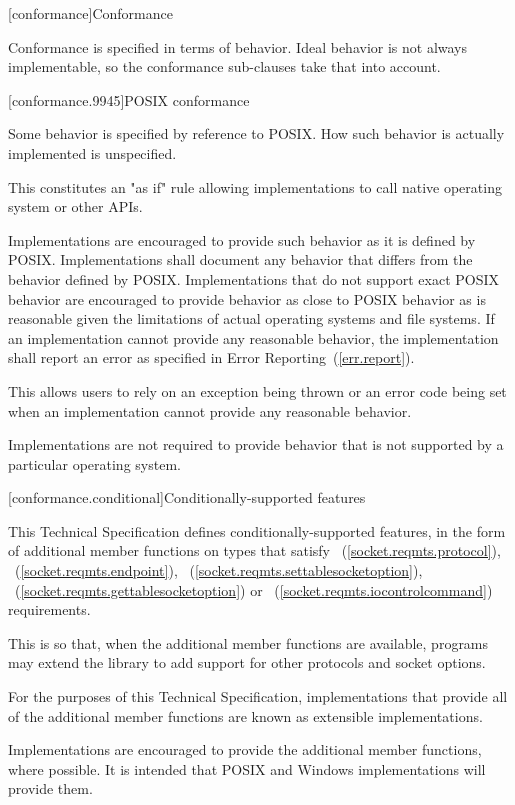 
[conformance]{Conformance}

\pnum
 Conformance is specified in terms of behavior. Ideal behavior is not always implementable, so the conformance sub-clauses take that into account.


[conformance.9945]{POSIX conformance}

\pnum
 Some behavior is specified by reference to POSIX. How such behavior is actually implemented is unspecified.

\pnum
 \enternote This constitutes an "as if" rule allowing implementations to call native operating system or other APIs. \exitnote

\pnum
Implementations are encouraged to provide such behavior as it is defined by POSIX. Implementations shall document any behavior that differs from the behavior defined by POSIX. Implementations that do not support exact POSIX behavior are encouraged to provide behavior as close to POSIX behavior as is reasonable given the limitations of actual operating systems and file systems. If an implementation cannot provide any reasonable behavior, the implementation shall report an error as specified in Error Reporting~(\ref{err.report}).

\pnum
 \enternote This allows users to rely on an exception being thrown or an error code being set when an implementation cannot provide any reasonable behavior. \exitnote

\pnum
 Implementations are not required to provide behavior that is not supported by a particular operating system.



[conformance.conditional]{Conditionally-supported features}

\pnum
This Technical Specification defines conditionally-supported features, in the form of additional member functions on types that satisfy ~(\ref{socket.reqmts.protocol}), ~(\ref{socket.reqmts.endpoint}), ~(\ref{socket.reqmts.settablesocketoption}), ~(\ref{socket.reqmts.gettablesocketoption}) or ~(\ref{socket.reqmts.iocontrolcommand}) requirements.

\pnum
 \enternote This is so that, when the additional member functions are available, \Cpp programs may extend the library to add support for other protocols and socket options. \exitnote

\pnum
For the purposes of this Technical Specification, implementations that provide all of the additional member functions are known as extensible implementations.

\pnum
 \enternote Implementations are encouraged to provide the additional member functions, where possible. It is intended that POSIX and Windows implementations will provide them. \exitnote



